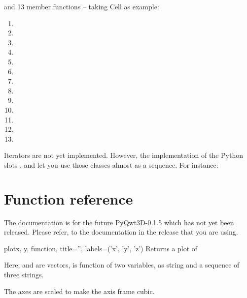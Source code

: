 \documentclass{manual}
\newcommand{\Future}{
  \begin{notice}[warning]
    The documentation is for the future PyQwt3D-0.1.5 which has not yet been
    released.  Please refer, to the documentation in the release that you are
    using.
  \end{notice}
}
\begin{document}
and 13 member functions -- taking Cell as example:
\begin{enumerate}
\item
\item
\item
\item
\item
\item
\item
\item
\item
\item
\item
\item
\item
\end{enumerate}

Iterators are not yet implemented. However, the implementation of the
Python slots ,  and
 let you use those classes almost as a sequence.
For instance:



\section{Function reference \label{functions}}

\Future{}

\begin{funcdesc}{plot}{x, y, function, title='', labels=('x', 'y', 'z')}
  Returns a plot of 
  
  Here,  and  are vectors,  is function of two
  variables,  as string and  a sequence of three strings.

  The axes are scaled to make the axis frame cubic.
\end{funcdesc}
\end{document}
